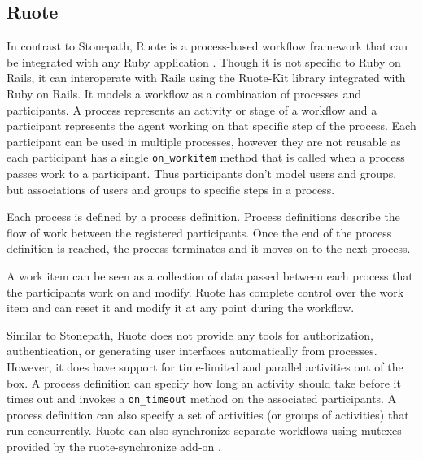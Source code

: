 \documentclass[document.tex]{subfiles}
\begin{document}
\subsection {Ruote}

In contrast to Stonepath, Ruote is a process-based workflow framework that can be integrated with any Ruby application \cite{ruote}. Though it is not specific to Ruby on Rails, it can interoperate with Rails using the Ruote-Kit library \cite{ruote-kit} integrated with Ruby on Rails. It models a workflow as a combination of processes and participants. A process represents an activity or stage of a workflow and a participant represents the agent working on that specific step of the process. Each participant can be used in multiple processes, however they are not reusable as each participant has a single \verb!on_workitem! method that is called when a process passes work to a participant. Thus participants don't model users and groups, but associations of users and groups to specific steps in a process.


Each process is defined by a process definition. Process definitions describe the flow of work between the registered participants. Once the end of the process definition is reached, the process terminates and it moves on to the next process.

A work item can be seen as a collection of data passed between each process that the participants work on and modify. Ruote has complete control over the work item and can reset it and modify it at any point during the workflow.

Similar to Stonepath, Ruote does not provide any tools for authorization, authentication, or generating user interfaces automatically from processes. However, it does have support for time-limited and parallel activities out of the box. A process definition can specify how long an activity should take before it times out and invokes a \verb!on_timeout! method on the associated participants. A process definition can also specify a set of activities (or groups of activities) that run concurrently. Ruote can also synchronize separate workflows using mutexes provided by the ruote-synchronize add-on \cite{ruote-synchronize}.
\end{document}
